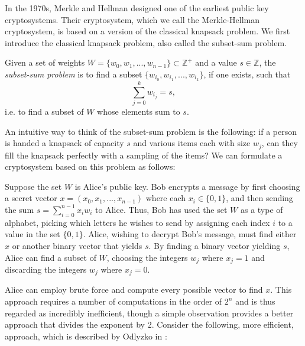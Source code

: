 \documentclass[a4paper,12pt]{article}
\begin{document}
In the 1970s, Merkle and Hellman designed one of the earliest public key cryptosystems. Their cryptosystem, which we call the Merkle-Hellman cryptosystem, is based on a version of the classical knapsack problem. We first introduce the classical knapsack problem, also called the subset-sum problem.

\begin{defn}
    Given a set of weights $W = \lbrace w_0, w_1, ..., w_{n-1} \rbrace \subset \mathbb{Z}^+$ and a value $s \in \mathbb{Z}$, the \textit{subset-sum problem} is to find a subset $\lbrace w_{i_{0}}, w_{i_{1}}, ..., w_{i_{k}} \rbrace$, if one exists, such that $$\sum_{j=0}^{k} w_{i_{j}} = s,$$
    i.e. to find a subset of $W$ whose elements sum to $s$.
\end{defn}

An intuitive way to think of the subset-sum problem is the following: if a person is handed a knapsack of capacity $s$ and various items each with size $w_j$, can they fill the knapsack perfectly with a sampling of the items? We can formulate a cryptosystem based on this problem as follows:

Suppose the set $W$ is Alice's public key. Bob encrypts a message by first choosing a secret vector $x = (x_0, x_1, ..., x_{n-1})$ where each $x_i \in \lbrace 0,1 \rbrace$, and then sending the sum $s = \sum_{i=0}^{n-1} x_{i}w_{i}$ to Alice. Thus, Bob has used the set $W$ as a type of alphabet, picking which letters he wishes to send by assigning each index $i$ to a value in the set $\lbrace 0,1 \rbrace$. Alice, wishing to decrypt Bob's message, must find either $x$ or another binary vector that yields $s$. By finding a binary vector yielding $s$, Alice can find a subset of $W$, choosing the integers $w_j$ where $x_j = 1$ and discarding the integers $w_j$ where $x_j = 0$. 

Alice can employ brute force and compute every possible vector to find $x$. This approach requires a number of computations in the order of $2^n$ and is thus regarded as incredibly inefficient, though a simple observation provides a better approach that divides the exponent by 2. Consider the following, more efficient, approach, which is described by Odlyzko in \cite{Odlyzko}:
\end{document}
